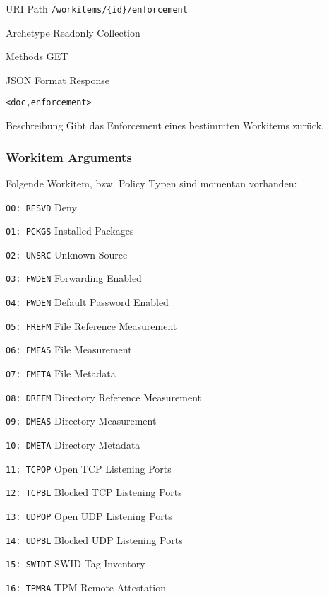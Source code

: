 \documentclass[10pt,a4paper]{scrartcl}
\begin{document}
\begin{mdframed}[style=def]
\begin{description*}
	\item[URI Path] \texttt{/workitems/\{id\}/enforcement}
	\item[Archetype] Readonly Collection
	\item[Methods] GET
	\item[JSON Format Response] \hfill
\begin{lstlisting}
<doc,enforcement>
\end{lstlisting}
    \item[Beschreibung] Gibt das Enforcement eines bestimmten Workitems zurück.
\end{description*}
\end{mdframed}

\subsubsection{Workitem Arguments}

Folgende Workitem, bzw. Policy Typen sind momentan vorhanden:
\begin{description*}
    \item[\texttt{00: RESVD}] Deny
    \item[\texttt{01: PCKGS}] Installed Packages
    \item[\texttt{02: UNSRC}] Unknown Source
    \item[\texttt{03: FWDEN}] Forwarding Enabled
    \item[\texttt{04: PWDEN}] Default Password Enabled
    \item[\texttt{05: FREFM}] File Reference Measurement
    \item[\texttt{06: FMEAS}] File Measurement 
    \item[\texttt{07: FMETA}] File Metadata
    \item[\texttt{08: DREFM}] Directory Reference Measurement
    \item[\texttt{09: DMEAS}] Directory Measurement
    \item[\texttt{10: DMETA}] Directory Metadata
    \item[\texttt{11: TCPOP}] Open TCP Listening Ports
    \item[\texttt{12: TCPBL}] Blocked TCP Listening Ports
    \item[\texttt{13: UDPOP}] Open UDP Listening Ports
    \item[\texttt{14: UDPBL}] Blocked UDP Listening Ports
    \item[\texttt{15: SWIDT}] SWID Tag Inventory
    \item[\texttt{16: TPMRA}] TPM Remote Attestation
\end{description*}
\end{document}
